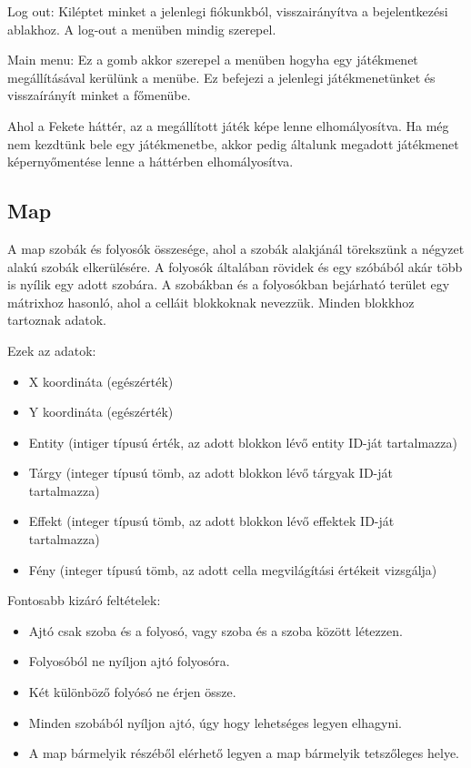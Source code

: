 Log out:
Kiléptet minket a jelenlegi fiókunkból, visszairányítva a bejelentkezési ablakhoz.
A log-out a menüben mindig szerepel.

Main menu:
Ez a gomb akkor szerepel a menüben hogyha egy játékmenet megállításával kerülünk a menübe.
Ez befejezi a jelenlegi játékmenetünket és visszaírányít minket a főmenübe.

Ahol a Fekete háttér, az a megállított játék képe lenne elhomályosítva.
Ha még nem kezdtünk bele egy játékmenetbe, akkor pedig általunk megadott játékmenet képernyőmentése lenne a háttérben elhomályosítva.


\subsection{Map}

A map szobák és folyosók összesége, ahol a szobák alakjánál törekszünk a négyzet alakú szobák elkerülésére. A folyosók általában rövidek és egy szóbából akár több is nyílik egy adott szobára.
A szobákban és a folyosókban bejárható terület egy mátrixhoz hasonló, ahol a celláit blokkoknak nevezzük.
Minden blokkhoz tartoznak adatok.

Ezek az adatok:

\begin{itemize}
    \item X koordináta (egészérték)
    \item Y koordináta (egészérték)
    \item Entity (intiger típusú érték,  az adott blokkon lévő entity ID-ját tartalmazza)
    \item Tárgy (integer típusú tömb, az adott blokkon lévő tárgyak ID-ját tartalmazza)
    \item Effekt (integer típusú tömb, az adott blokkon lévő effektek ID-ját tartalmazza)
    \item Fény (integer típusú tömb, az adott cella megvilágítási értékeit vizsgálja)
\end{itemize}

Fontosabb kizáró feltételek:

\begin{itemize}
    \item Ajtó csak szoba és a folyosó, vagy szoba és a szoba között létezzen.
    \item Folyosóból ne nyíljon ajtó folyosóra.
    \item Két különböző folyósó ne érjen össze.
    \item Minden szobából nyíljon ajtó, úgy hogy lehetséges legyen elhagyni.
    \item A map bármelyik részéből elérhető legyen a map bármelyik tetszőleges helye.
\end{itemize}

